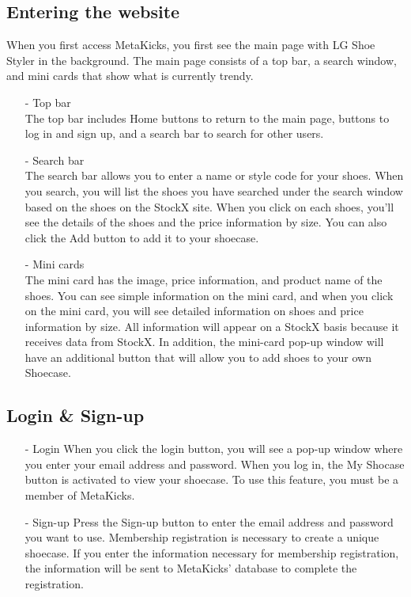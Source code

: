 \documentclass[conference]{IEEEtran}
\begin{document}
\begin{enumerate}
\subsection{Entering the website}
When you first access MetaKicks, you first see the main page with LG Shoe Styler in the background. The main page consists of a top bar, a search window, and mini cards that show what is currently trendy.\\
\begin{enumerate}
\item[-]Top bar\\
The top bar includes  Home buttons to return to the main page, buttons to log in and sign up, and a search bar to search for other users.\\
\item[-]Search bar\\
The search bar allows you to enter a name or style code for your shoes. When you search, you will list the shoes you have searched under the search window based on the shoes on the StockX site. When you click on each shoes, you'll see the details of the shoes and the price information by size. You can also click the Add button to add it to your shoecase.\\
\item[-]Mini cards\\
The mini card has the image, price information, and product name of the shoes. You can see simple information on the mini card, and when you click on the mini card, you will see detailed information on shoes and price information by size. All information will appear on a StockX basis because it receives data from StockX. In addition, the mini-card pop-up window will have an additional button that will allow you to add shoes to your own Shoecase.\\
\end{enumerate}

\subsection{Login \& Sign-up}
\begin{enumerate}
\item[-]Login
When you click the login button, you will see a pop-up window where you enter your email address and password. When you log in, the My Shocase button is activated to view your shoecase. To use this feature, you must be a member of MetaKicks.\\
\item[-]Sign-up
Press the Sign-up button to enter the email address and password you want to use. Membership registration is necessary to create a unique shoecase. If you enter the information necessary for membership registration, the information will be sent to MetaKicks' database to complete the registration.\\\\
\end{enumerate}

\end{enumerate}
\end{document}
